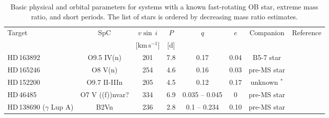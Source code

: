 \documentclass{aa}
\newcommand{\kms}{$\mathrm{km\,s^{-1}}$}
\newcommand{\vsini} {$v\sin\,i$}
\begin{document}
\begin{table*}[!htbp]
{\small
\caption{Basic physical and orbital parameters for systems with a known fast-rotating OB star, extreme mass ratio, and short periods. The list of stars is ordered by decreasing mass ratio estimates.}
\label{table:ref_fast}
\begin{tabular}{l |c c c c c c c}
\hline
\hline
Target                  & SpC    &  \vsini  & $P$ & $q$ &
                                                                       $e$  & Companion  & Reference \\
& & [\kms] & [d] & & & & \\
\hline
HD\,163892        &    O9.5 IV(n)       &     201       &    7.8     &  0.17              &   0.04     &  B5-7 star     &   \citet{Mahy_2022}     \\
HD\,165246        &    O8 V(n)          &     254         &    4.6     &  0.16               &   0.03   &  pre-MS star  &   \citet{Johnston2021}       \\
HD\,152200        &   O9.7 II-IIIn       &     205        &    4.5     &     0.12             &  0.17     &  unknown $^{\ast}$   &   \citet{Britavskiy_2023}     \\
HD\,46485         &   O7 V ((f))nvar?    &     334        &    6.9     &     0.035 -- 0.045      &  0     &  pre-MS star     &   \citet{Naze_2023_rot}     \\
HD\,138690 ($\gamma$ Lup A)  &   B2Vn     &     236        &    2.8     &     0.1 -- 0.234            &  0.10    &  pre-MS star     &   \citet{Jerzykiewicz_2021}     \\

\end{tabular}}
\end{table*}
\end{document}
